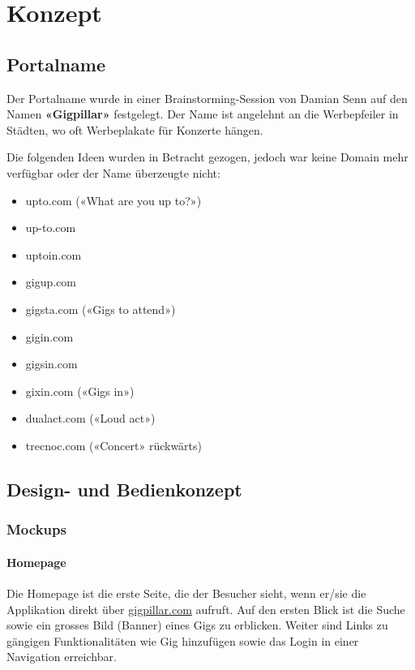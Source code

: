 \chapter{Konzept}

\label{AppendixKonzept}

\section{Portalname}\label{portalname}

Der Portalname wurde in einer Brainstorming-Session von Damian Senn auf
den Namen \textbf{«Gigpillar»} festgelegt. Der Name ist angelehnt an die Werbepfeiler in
Städten, wo oft Werbeplakate für Konzerte hängen.

Die folgenden Ideen wurden in Betracht gezogen, jedoch war keine Domain mehr
verfügbar oder der Name überzeugte nicht:

\begin{itemize}
  \item{} upto.com («What are you up to?»)
  \item{} up-to.com
  \item{} uptoin.com
  \item{} gigup.com
  \item{} gigsta.com («Gigs to attend»)
  \item{} gigin.com
  \item{} gigsin.com
  \item{} gixin.com («Gigs in»)
  \item{} dualact.com («Loud act»)
  \item{} trecnoc.com («Concert» rückwärts)
\end{itemize}

\clearpage
\section{Design- und Bedienkonzept}\label{design--und-bedienkonzept}

\subsection{Mockups}

\subsubsection{Homepage}

Die Homepage ist die erste Seite, die der Besucher sieht, wenn er/sie die
Applikation direkt über \href{https://gigpillar.com/}{gigpillar.com} aufruft.
Auf den ersten Blick ist die Suche sowie ein grosses Bild (Banner) eines Gigs
zu erblicken. Weiter sind Links zu gängigen Funktionalitäten wie Gig hinzufügen
sowie das Login in einer Navigation erreichbar.


